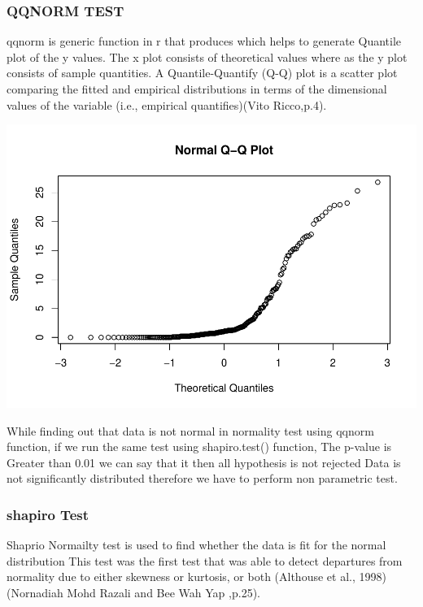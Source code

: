 \documentclass[
]{article}
\begin{document}
\hypertarget{qqnorm-test}{%
\subsubsection{QQNORM TEST}\label{qqnorm-test}}

qqnorm is generic function in r that produces which helps to generate
Quantile plot of the y values. The x plot consists of theoretical values
where as the y plot consists of sample quantities. A Quantile-Quantify
(Q-Q) plot is a scatter plot comparing the fitted and empirical
distributions in terms of the dimensional values of the variable (i.e.,
empirical quantifies)(Vito Ricco,p.4).

\includegraphics{Statistical-analysis-in-RStudio_files/figure-latex/unnamed-chunk-4-1.pdf}

While finding out that data is not normal in normality test using qqnorm
function, if we run the same test using shapiro.test() function, The
p-value is Greater than 0.01 we can say that it then all hypothesis is
not rejected Data is not significantly distributed therefore we have to
perform non parametric test.

\hypertarget{shapiro-test}{%
\subsubsection{shapiro Test}\label{shapiro-test}}

Shaprio Normailty test is used to find whether the data is fit for the
normal distribution This test was the first test that was able to detect
departures from normality due to either skewness or kurtosis, or both
(Althouse et al., 1998)(Nornadiah Mohd Razali and Bee Wah Yap ,p.25).
\end{document}

